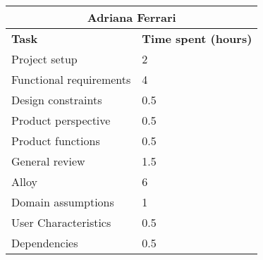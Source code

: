 \begin{table}[h]
  \center
  \begin{tabular}{l|l}
    \multicolumn{2}{c}{\textbf{Adriana Ferrari}} \\
    \hline
    \textbf{Task} & \textbf{Time spent (hours)}\\
    \hline
    Project setup & 2 \\
    Functional requirements & 4 \\
    Design constraints & 0.5 \\
    Product perspective & 0.5 \\
    Product functions & 0.5 \\
    General review & 1.5 \\
    Alloy & 6 \\
    Domain assumptions & 1 \\
    User Characteristics & 0.5 \\
    Dependencies & 0.5 \\
  \end{tabular}
\end{table}